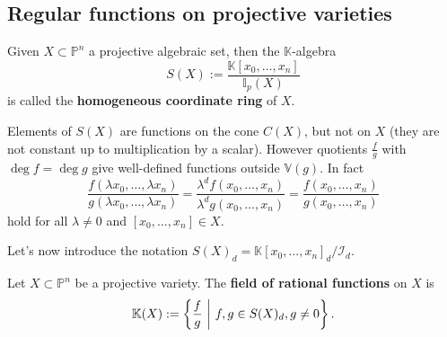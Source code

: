 \subsection{Regular functions on projective varieties}

\begin{defn}
	Given $X \subset \mathbb{P}^{n}$ a projective algebraic set, then the $\mathbb{K}$-algebra
	\begin{equation}
		S(X) := \frac{\mathbb{K}\left[x_0, \ldots, x_n \right]}{\mathbb{I}_p\left( X \right)}
	\end{equation} 
	is called the \textbf{homogeneous coordinate ring} of $X$.
\end{defn}

\begin{rem}
	Elements of $S(X)$ are functions on the cone $C(X)$, but not on $X$
	(they are not constant up to multiplication by a scalar).
	However quotients $\frac{f}{g}$ with $\deg f = \deg g$ give well-defined functions outside $\mathbb{V}\left( g \right)$.
	In fact
	\begin{equation}
	\frac{f \left( \lambda x_0, \ldots, \lambda x_n \right)}{ g \left( \lambda x_0, \ldots, \lambda x_n \right)} = \frac{\lambda^d f \left( x_0, \ldots, x_n \right)}{\lambda^d g \left( x_0, \ldots, x_n \right)} = \frac{f \left( x_0, \ldots, x_n \right)}{g \left( x_0, \ldots, x_n \right)}
	\end{equation} 
	hold for all $\lambda \neq 0$ and $ \left[ x_0 , \ldots , x_n \right] \in X$.

	Let's now introduce the notation $S(X)_d = \mathbb{K}\left[x_0, \ldots, x_n \right]_d / \mathcal{I}_d$.
\end{rem}

\begin{defn}
	Let $X \subset \mathbb{P}^{n}$ be a projective variety.
	The \textbf{field of rational functions} on $X$ is
	\begin{equation}
		\K(X) := \left\{ \frac{f}{g} \ \middle|\ f,g \in S(X)_d, g \neq 0 \right\}
	.\end{equation} 
\end{defn}

